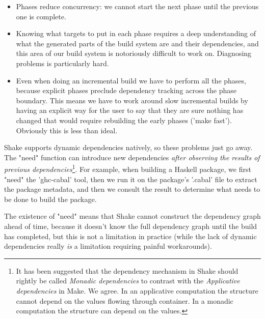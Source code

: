 \begin{itemize}
\item Phases reduce concurrency: we cannot start the next phase until
  the previous one is complete.
\item Knowing what targets to put in each phase requires a deep
  understanding of what the generated parts of the build system are
  and their dependencies, and this area of our build system is
  notoriously difficult to work on.  Diagnosing problems is
  particularly hard.
\item Even when doing an incremental build we have to perform all the
  phases, because explicit phases preclude dependency tracking across
  the phase boundary.  This means we have to work around slow
  incremental builds by having an explicit way for the user to say
  that they are sure nothing has changed that would require rebuilding
  the early phases (\lst'make fast').  Obviously this is less than
  ideal.
\end{itemize}

Shake supports dynamic dependencies natively, so these problems just
go away.  The \lst"need" function can introduce new dependencies
\emph{after observing the results of previous dependencies}\footnote{It has been
suggested that the dependency mechanism in Shake should rightly be called
\emph{Monadic dependencies} to contrast with the \emph{Applicative dependencies}
in Make. We agree. In an applicative computation the structure cannot depend on
the values flowing through container. In a monadic computation the structure can
depend on the values.}. For example, when building a Haskell package, we first
\lst"need" the \lst'ghc-cabal' tool, then we run it on the package's \lst'.cabal' file to
extract the package metadata, and then we consult the result to determine what
needs to be done to build the package.

The existence of \lst"need" means that Shake cannot construct the
dependency graph ahead of time, because it doesn't know the full
dependency graph until the build has completed, but this is not a
limitation in practice (while the lack of dynamic dependencies really
\emph{is} a limitation requiring painful workarounds).


